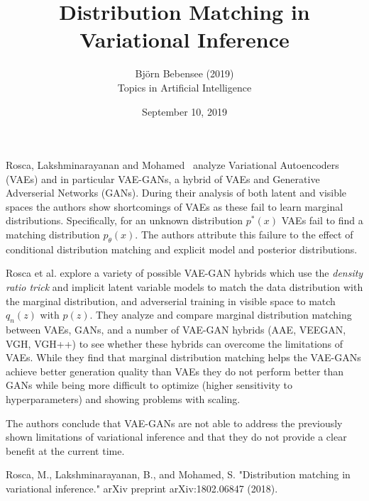 \documentclass[12pt]{article}
\begin{document}
 
 
\title{Distribution Matching in Variational Inference}
\author{Bj\"orn Bebensee (2019)\\ %
Topics in Artificial Intelligence}
\date{September 10, 2019}
\maketitle

Rosca, Lakshminarayanan and Mohamed~\cite{rosca} analyze Variational Autoencoders (VAEs) and in particular VAE-GANs, a hybrid of VAEs and Generative Adverserial Networks (GANs). During their analysis of both latent and visible spaces the authors show shortcomings of VAEs as these fail to learn marginal distributions. Specifically, for an unknown distribution $p^*(x)$ VAEs fail to find a matching distribution $p_{\theta}(x)$. The authors attribute this failure to the effect of conditional distribution matching and explicit model and posterior distributions.

Rosca et al. explore a variety of possible VAE-GAN hybrids which use the \emph{density ratio trick} and implicit latent variable models to match the data distribution with the marginal distribution, and adverserial training in visible space to match $q_n(z)$ with $p(z)$. They analyze and compare marginal distribution matching between VAEs, GANs, and a number of VAE-GAN hybrids (AAE, VEEGAN, VGH, VGH++) to see whether these hybrids can overcome the limitations of VAEs. While they find that marginal distribution matching helps the VAE-GANs achieve better generation quality than VAEs they do not perform better than GANs while being more difficult to optimize (higher sensitivity to hyperparameters) and showing problems with scaling.

The authors conclude that VAE-GANs are not able to address the previously shown limitations of variational inference and that they do not provide a clear benefit at the current time.

\begin{thebibliography}{9}
Rosca, M., Lakshminarayanan, B., and Mohamed, S. "Distribution matching in variational inference." arXiv preprint arXiv:1802.06847 (2018).

\end{thebibliography}
 
\end{document}
